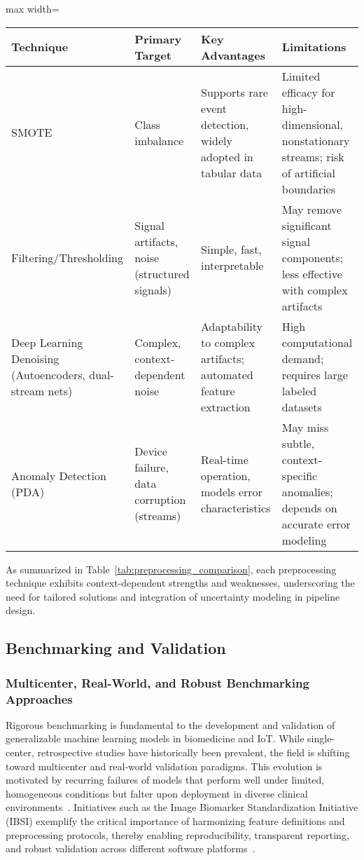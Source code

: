 \documentclass[sigconf]{acmart}
\begin{document}
\begin{table*}[htbp]
\centering
\caption{Comparison of Preprocessing Techniques for Biomedical and IoT Data}
\label{tab:preprocessing_comparison}
\begin{adjustbox}{max width=\textwidth}
\begin{tabular}{llll}
\toprule
\textbf{Technique} & \textbf{Primary Target} & \textbf{Key Advantages} & \textbf{Limitations} \\
\midrule
SMOTE & Class imbalance & Supports rare event detection, widely adopted in tabular data & Limited efficacy for high-dimensional, nonstationary streams; risk of artificial boundaries\\
Filtering/Thresholding & Signal artifacts, noise (structured signals) & Simple, fast, interpretable & May remove significant signal components; less effective with complex artifacts\\
Deep Learning Denoising (Autoencoders, dual-stream nets) & Complex, context-dependent noise & Adaptability to complex artifacts; automated feature extraction & High computational demand; requires large labeled datasets\\
Anomaly Detection (PDA) & Device failure, data corruption (streams) & Real-time operation, models error characteristics & May miss subtle, context-specific anomalies; depends on accurate error modeling\\
\bottomrule
\end{tabular}
\end{adjustbox}
\end{table*}

As summarized in Table~\ref{tab:preprocessing_comparison}, each preprocessing technique exhibits context-dependent strengths and weaknesses, underscoring the need for tailored solutions and integration of uncertainty modeling in pipeline design.

\subsection{Benchmarking and Validation}

\subsubsection{Multicenter, Real-World, and Robust Benchmarking Approaches}

Rigorous benchmarking is fundamental to the development and validation of generalizable machine learning models in biomedicine and IoT. While single-center, retrospective studies have historically been prevalent, the field is shifting toward multicenter and real-world validation paradigms. This evolution is motivated by recurring failures of models that perform well under limited, homogeneous conditions but falter upon deployment in diverse clinical environments~\cite{ref31,ref33,ref44}. Initiatives such as the Image Biomarker Standardization Initiative (IBSI) exemplify the critical importance of harmonizing feature definitions and preprocessing protocols, thereby enabling reproducibility, transparent reporting, and robust validation across different software platforms~\cite{ref49,ref50,ref54}.
\end{document}
